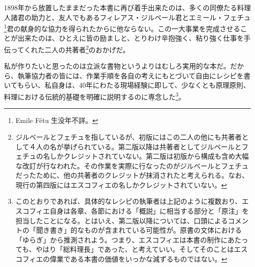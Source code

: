 \begin{Main}
1898年から放置したままだった本書に再び着手出来たのは、多くの同僚たる料理人諸君の助力と、友人でもあるフィレアス・ジルベール君とエミール・フェチュ\footnote{Emile
  Fétu 生没年不詳。}君の献身的な協力を得られたからに他ならない。この一大事業を完成させることが出来たのは、ひとえに皆の励ましと、とりわけ辛抱強く、粘り強く仕事を手伝ってくれた二人の共著者\footnote{ジルベールとフェチュを指しているが、初版にはこの二人の他にも共著者として４人の名が挙げられている。第二版以降は共著者としてジルベールとフェチュの名しかクレジットされていない。第二版は初版から構成も含め大幅な改訂が行なわれた。その作業を実際に行なったのがジルベールとフェチュだったために、他の共著者のクレジットが抹消されたと考えられる。なお、現行の第四版にはエスコフィエの名しかクレジットされていない。}のおかげだ。

私が作りたいと思ったのは立派な書物というよりはむしろ実用的な本だ。だから、執筆協力者の皆には、作業手順を各自の考えにもとづいて自由にレシピを書いてもらい、私自身は、40年にわたる現場経験に即して、少なくとも原理原則、料理における伝統的基礎を明確に説明するのに専念した\footnote{このとおりであれば、具体的なレシピの執筆者は上記のように複数おり、エスコフィエ自身は各章、各節における「概説」に相当する部分と「原注」を担当したことになる。とはいえ、第二版以降については、口頭によるコメントの「聞き書き」的なものが含まれている可能性が。原書の文体における「ゆらぎ」から推測されよう。つまり、エスコフィエは本書の制作にあたっても、やはり「総料理長」であった、と考えていい。そしてそのことはエスコフィエの偉業である本書の価値をいっかな減ずるものではない。}。


\end{Main}
